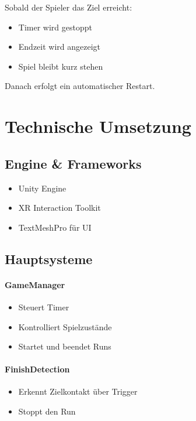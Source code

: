 \documentclass[11pt,a4paper]{article}
\begin{document}
Sobald der Spieler das Ziel erreicht:

\begin{itemize}
    \item Timer wird gestoppt
    \item Endzeit wird angezeigt
    \item Spiel bleibt kurz stehen
\end{itemize}

Danach erfolgt ein automatischer Restart.

\section{Technische Umsetzung}

\subsection{Engine \& Frameworks}

\begin{itemize}
    \item Unity Engine
    \item XR Interaction Toolkit
    \item TextMeshPro für UI
\end{itemize}

\subsection{Hauptsysteme}

\paragraph{GameManager}
\begin{itemize}
    \item Steuert Timer
    \item Kontrolliert Spielzustände
    \item Startet und beendet Runs
\end{itemize}

\paragraph{FinishDetection}
\begin{itemize}
    \item Erkennt Zielkontakt über Trigger
    \item Stoppt den Run
\end{itemize}
\end{document}
